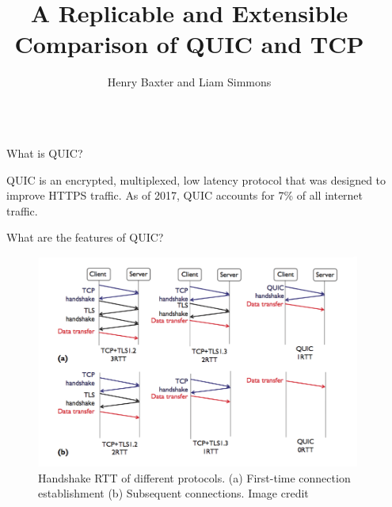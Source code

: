 \documentclass[final]{beamer}
\title{A Replicable and Extensible Comparison of QUIC and TCP} %
\author{Henry Baxter and Liam Simmons} %
\institute{University of Victoria - CSC 466} %
\newlength{\sepwid}
\newlength{\onecolwid}
\begin{document}

\setlength{\belowcaptionskip}{2ex} %
\setlength\belowdisplayshortskip{2ex} %

\begin{frame}[t] %

\begin{columns}[t] %

\begin{column}{\sepwid}\end{column} %

\begin{column}{\onecolwid} %


\begin{block}{What is QUIC?}

QUIC is an encrypted, multiplexed, low latency protocol that was designed to improve HTTPS traffic. \cite{Langley:2017:QTP:3098822.3098842} As of 2017, QUIC accounts for 7\% of all internet traffic. \cite{Kakhki:2017:TLL:3131365.3131368}

\end{block}

\begin{block}{What are the features of QUIC?}

\begin{figure}
\includegraphics[width=0.8\linewidth]{images/QUIC_TCP_RTT.png}
\caption{Handshake RTT of different protocols. (a) First-time connection establishment (b) Subsequent connections. Image credit \cite{7867726}}
\end{figure}


\end{block}
\end{column}
\end{columns}
\end{frame}
\end{document}
